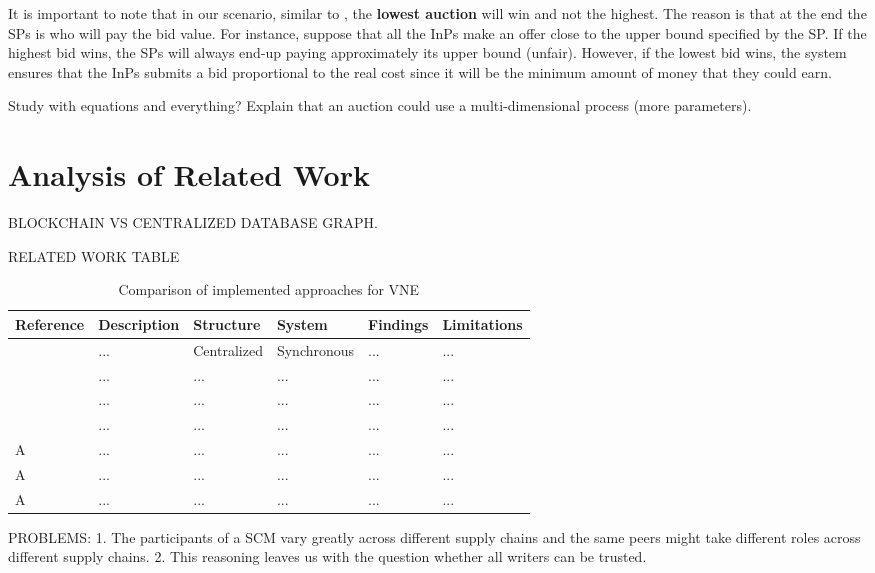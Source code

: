 It is important to note that in our scenario, similar to \citep{zaheer2010multi}, the \textbf{lowest auction} will win and not the highest. The reason is that at the end the SPs is who will pay the bid value. For instance, suppose that all the InPs make an offer close to the upper bound specified by the SP. If the highest bid wins, the SPs will always end-up paying approximately its upper bound (unfair). However, if the lowest bid wins, the system ensures that the InPs submits a bid proportional to the real cost since it will be the minimum amount of money that they could earn.

Study \citep{ausubel2006lovely} with equations and everything?
Explain that an auction could use a multi-dimensional process (more parameters).
\section{Analysis of Related Work}

BLOCKCHAIN VS CENTRALIZED DATABASE GRAPH.

RELATED WORK TABLE

\begin{table}[htbp]
	\myfloatalign \footnotesize
	\begin{tabularx}{\textwidth}{p{2cm}p{2cm}p{2cm}p{2cm}p{4cm}p{4cm}}
		\textbf{Reference} & \textbf{Description} & \textbf{Structure} & \textbf{System} & \textbf{Findings} & \textbf{Limitations}  \\ 
		\hline
		\citep{dietrich2015multi}   &  ... & Centralized & Synchronous &  ... &  ... \\ 
		\citep{esposito2013general}   &  ... &  ... &  ... &  ... &  ... \\ 
		\citep{chowdhury2010polyvine}   &  ... &  ... &  ... &  ... &  ... \\ 
		\citep{zaheer2010multi}   &  ... &  ... &  ... &  ... &  ... \\ 
		A   &  ... &  ... &  ... &  ... &  ... \\ 
		A   &  ... &  ... &  ... &  ... &  ... \\ 							
		A   &  ... &  ... &  ... &  ... &  ... \\  
		\hline
	\end{tabularx}
	\caption{Comparison of implemented approaches for VNE}
	\label{tab:VNEComparison}
\end{table}

PROBLEMS: 1. The participants of a SCM vary greatly across different supply
chains and the same peers might take different roles across different supply chains. 2. This reasoning leaves us with the question whether all writers
can be trusted. 

